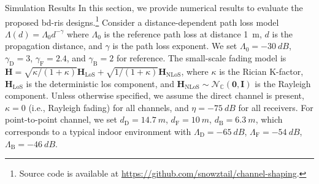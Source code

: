 \documentclass[journal]{IEEEtran}
\begin{document}
\begin{section}{Simulation Results}
	\label{sc:simulation}
	In this section, we provide numerical results to evaluate the proposed \gls{bd}-\gls{ris} designs.\footnote{Source code is available at \url{https://github.com/snowztail/channel-shaping}.}
	Consider a distance-dependent path loss model $\Lambda(d) = \Lambda_0 d^{-\gamma}$ where $\Lambda_0$ is the reference path loss at distance \qty{1}{m}, $d$ is the propagation distance, and $\gamma$ is the path loss exponent.
	We set $\Lambda_0=\qty{-30}{dB}$, $\gamma_\mathrm{D}=3$, $\gamma_\mathrm{F}=2.4$, and $\gamma_\mathrm{B}=2$ for reference.
	The small-scale fading model is $\mathbf{H} = \sqrt{\kappa/(1+\kappa)} \mathbf{H}_\text{LoS} + \sqrt{1/(1+\kappa)} \mathbf{H}_\text{NLoS}$, where $\kappa$ is the Rician K-factor, $\mathbf{H}_\text{LoS}$ is the deterministic \gls{los} component, and $\mathbf{H}_\text{NLoS} \sim \mathcal{N}_{\mathbb{C}}(\mathbf{0}, \mathbf{I})$ is the Rayleigh component.
	Unless otherwise specified, we assume the direct channel is present, $\kappa = 0$ (i.e., Rayleigh fading) for all channels, and $\eta = \qty{-75}{dB}$ for all receivers.
	For point-to-point channel, we set $d_\mathrm{D}=\qty{14.7}{m}$, $d_\mathrm{F}=\qty{10}{m}$, $d_\mathrm{B}=\qty{6.3}{m}$, which corresponds to a typical indoor environment with $\Lambda_\mathrm{D}=\qty{-65}{dB}$, $\Lambda_\mathrm{F}=\qty{-54}{dB}$, $\Lambda_\mathrm{B}=\qty{-46}{dB}$.


\end{section}
\end{document}
